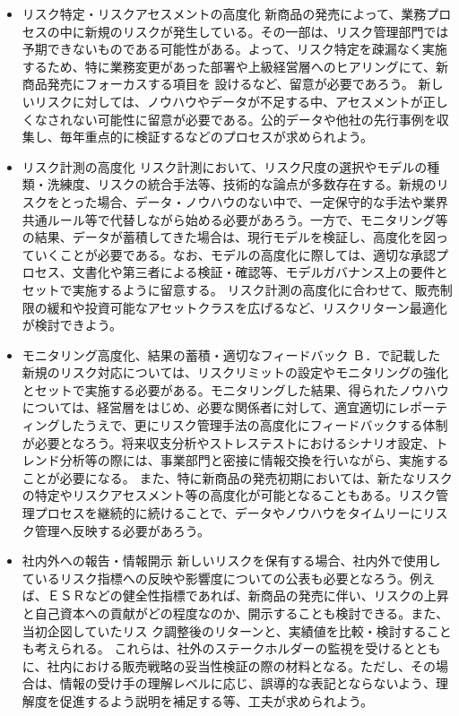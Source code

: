 \documentclass[report,gutter=10mm,fore-edge=10mm,uplatex,dvipdfmx]{jlreq}
\begin{document}
\begin{itemize}
\item[] リスク特定・リスクアセスメントの高度化
新商品の発売によって、業務プロセスの中に新規のリスクが発生している。その一部は、リスク管理部門では予期できないものである可能性がある。よって、リスク特定を疎漏なく実施するため、特に業務変更があった部署や上級経営層へのヒアリングにて、新商品発売にフォーカスする項目を
設けるなど、留意が必要であろう。
新しいリスクに対しては、ノウハウやデータが不足する中、アセスメントが正しくなされない可能性に留意が必要である。公的データや他社の先行事例を収集し、毎年重点的に検証するなどのプロセスが求められよう。
\item[] リスク計測の高度化
リスク計測において、リスク尺度の選択やモデルの種類・洗練度、リスクの統合手法等、技術的な論点が多数存在する。新規のリスクをとった場合、データ・ノウハウのない中で、一定保守的な手法や業界共通ルール等で代替しながら始める必要があろう。一方で、モニタリング等の結果、データが蓄積してきた場合は、現行モデルを検証し、高度化を図っていくことが必要である。なお、モデルの高度化に際しては、適切な承認プロセス、文書化や第三者による検証・確認等、モデルガバナンス上の要件とセットで実施するように留意する。
リスク計測の高度化に合わせて、販売制限の緩和や投資可能なアセットクラスを広げるなど、リスクリターン最適化が検討できよう。
\item[] モニタリング高度化、結果の蓄積・適切なフィードバック
Ｂ．で記載した新規のリスク対応については、リスクリミットの設定やモニタリングの強化とセットで実施する必要がある。モニタリングした結果、得られたノウハウについては、経営層をはじめ、必要な関係者に対して、適宜適切にレポーティングしたうえで、更にリスク管理手法の高度化にフィードバックする体制が必要となろう。将来収支分析やストレステストにおけるシナリオ設定、トレンド分析等の際には、事業部門と密接に情報交換を行いながら、実施することが必要になる。
また、特に新商品の発売初期においては、新たなリスクの特定やリスクアセスメント等の高度化が可能となることもある。リスク管理プロセスを継続的に続けることで、データやノウハウをタイムリーにリスク管理へ反映する必要があろう。
\item[] 社内外への報告・情報開示
新しいリスクを保有する場合、社内外で使用しているリスク指標への反映や影響度についての公表も必要となろう。例えば、ＥＳＲなどの健全性指標であれば、新商品の発売に伴い、リスクの上昇と自己資本への貢献がどの程度なのか、開示することも検討できる。また、当初企図していたリス
ク調整後のリターンと、実績値を比較・検討することも考えられる。
これらは、社外のステークホルダーの監視を受けるとともに、社内における販売戦略の妥当性検証の際の材料となる。ただし、その場合は、情報の受け手の理解レベルに応じ、誤導的な表記とならないよう、理解度を促進するよう説明を補足する等、工夫が求められよう。

\end{itemize}
\end{document}
